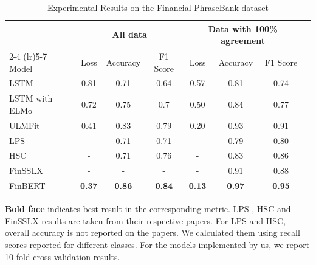 \documentclass[../main.tex]{subfiles}
\begin{document}
\begin{table}
\begin{threeparttable}
    \caption{Experimental Results on the Financial PhraseBank dataset}
  \label{tab:results}
  \begin{tabular}{lccccccc}
    \toprule
      &  \multicolumn{3}{c}{All data} & \multicolumn{3}{c}{Data with 100\% agreement}\\
      \cmidrule(lr){2-4}
      \cmidrule(lr){5-7}
      Model & Loss & Accuracy & F1 Score & Loss & Accuracy & F1 Score \\
    \midrule
    LSTM &                  0.81 & 0.71 & 0.64 & 0.57 & 0.81 & 0.74 \\
    LSTM with ELMo &        0.72 & 0.75 & 0.7 & 0.50 & 0.84 & 0.77 \\
    ULMFit &                0.41 & 0.83 & 0.79 & 0.20 & 0.93 & 0.91 \\
    \midrule
    LPS &                   - & 0.71 & 0.71 & - & 0.79 & 0.80 \\
    HSC &                   -  & 0.71 & 0.76 & - & 0.83 & 0.86 \\
    FinSSLX &                   -  & - & - & - & 0.91 & 0.88 \\
    \midrule
    FinBERT &               \textbf{0.37} & \textbf{0.86} & \textbf{0.84} & \textbf{0.13} & \textbf{0.97} & \textbf{0.95} \\
  \bottomrule
\end{tabular}
    \begin{tablenotes}
        \small
        \item \textbf{Bold face} indicates best result in the corresponding metric. LPS \cite{Malo2014}, HSC \cite{Krishnamoorthy2018} and FinSSLX \cite{Maia2018} results are taken from their respective papers. For LPS and HSC, overall accuracy is not reported on the papers. We calculated them using recall scores reported for different classes. For the models implemented by us, we report 10-fold cross validation results. 
    \end{tablenotes}
\end{threeparttable}
\end{table}
\end{document}
